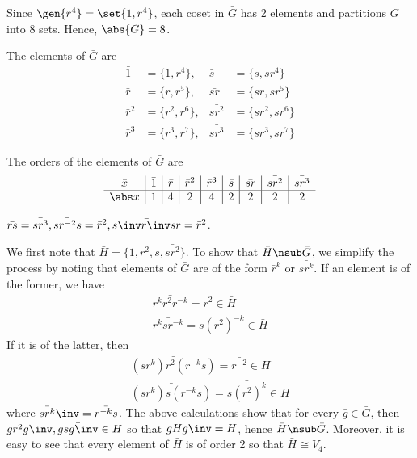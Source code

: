 \begin{solalph}
    \item Since $\gen{r^4} = \set{1, r^4}$, each coset in $\bar G$ has 2 elements and partitions $G$ into 8 sets. Hence, $\abs{\bar G} = 8$.
    \item The elements of $\bar G$ are
    \begin{align*}
        \bar 1 & = \{1, r^4\}, & \bar{s} & = \{s, sr^4\} \\
        \bar r & = \{r, r^5\}, & \bar{sr} & = \{sr, sr^5\} \\
        \bar r^2 & = \{r^2, r^6\}, & \bar{sr^2} & = \{sr^2, sr^6\} \\
        \bar r^3 & = \{r^3, r^7\}, & \bar{sr^3} & = \{sr^3, sr^7\}
    \end{align*}
    \item The orders of the elements of $\bar G$ are
    \[
    \begin{array}{c|c|c|c|c|c|c|c|c}
        \bar x & \bar 1 & \bar r & \bar r^2 & \bar r^3 & \bar s & \bar{sr} & \bar{sr^2} & \bar{sr^3} \\
        \hline
        \abs x & 1 & 4 & 2 & 4 & 2 & 2 & 2 & 2
    \end{array}
    \]
    \item $\bar{rs} = \bar{sr^3}, \bar{sr^{-2}s} = \bar r^2, \bar{s\inv r\inv sr} = \bar r^2$.
    \item We first note that $\bar H = \{1, \bar r^2, \bar s, \bar{sr^2}\}$. To show that $\bar H \nsub \bar G$, we simplify the process by noting that elements of $\bar G$ are of the form $\bar r^k$ or $\bar{sr^k}$. If an element is of the former, we have
    \begin{align*}
        \bar{r^kr^2r^{-k}} = \bar r^2 \in \bar H \\
        \bar{r^ksr^{-k}} = \bar{s(r^2)^{-k}} \in \bar H
    \end{align*}
    If it is of the latter, then
    \begin{align*}
        \bar{(sr^k)r^2(r^{-k}s)} = \bar{r^{-2}} \in H \\
        \bar{(sr^k)s(r^{-k}s)} = \bar{s(r^2)^k} \in H
    \end{align*}
    where $\bar{sr^k}\inv = \bar{r^{-k}s}$. The above calculations show that for every $\bar g \in \bar G$, then $\bar{gr^2g\inv}, \bar{gsg\inv} \in H$ so that $\bar{gHg\inv} = \bar H$, hence $\bar H \nsub \bar G$. Moreover, it is easy to see that every element of $\bar H$ is of order 2 so that $\bar H \cong V_4$.


\end{solalph}
